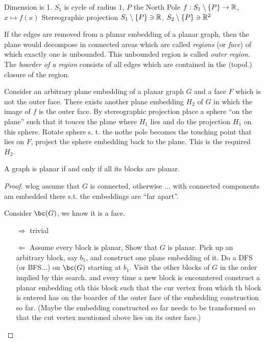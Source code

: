 \documentclass[aagt.tex]{subfiles}
\begin{document}
\begin{rem}
  Dimension is 1. $S_1$ is cycle of radius $1$, $P$ the North Pole
  $f: S_1 \setminus \{P\} \to \mathbb{R}$, $x \mapsto f(x)$
  Stereographic projection $S_1 \setminus \{P\} \ni \mathbb{R}$, $S_2 \setminus \{P\} \ni \mathbb{R}^2$
\end{rem}

\begin{defi*}
  If the edges are removed from a planar embedding of a planar graph, then the plane would decompose in connected areas which are called \emph{regions} (or \emph{face}) of which exactly one is unbounded.
  This unbounded region is called \emph{outer region}. The \emph{boarder of a region} consists of  all edges which are contained in the (topol.) closure of the region.
\end{defi*}

\begin{rem}
  Consider an arbitrary plane embedding of a planar graph $G$ and a face $F$ which is not the outer face.
  There exists another plane embedding $H_2$ of $G$ in which the image of $f$ is the outer face.
  By stereographic projection place a sphere \enquote{on the plane} such that it touces the plane where $H_1$ lies
  and do the projection $H_1$ on this sphere. Rotate sphere s. t. the nothe pole becomes the touching point that lies on $F$, project the sphere embedding back to the plane. This is the required $H_2$.
\end{rem}

\begin{prop}[4.1]\label{p_4_1}
  A graph is planar if and only if all its blocks are planar.
\end{prop}

\begin{proof}
  wlog assume that $G$ is connected, otherwise ... with connected components am embedded there s.t. the embeddings are \enquote{far apart}.
  
  Consider $\bc(G)$, we know it is a face.
  \begin{enumerate}
    \item[$\Rightarrow$] trivial
    \item[$\Leftarrow$] Assume every block is planar, Show that $G$ is planar.
    Pick up an arbitrary block, say $b_1$, and construct one plane embedding of it.
    Do a DFS (or BFS...) on $\bc(G)$ starting at $b_1$.
    Visit the other blocks of $G$ in the order implied by this search.
    and every time a new block is encountered construct a planar embedding oth this block such that the cur vertex from which th block is entered has on the boarder of the outer face of the embedding construction so far.
    (Maybe the embedding constructed so far needs to be transformed so that the cut vertex mentioned above lies on its outer face.)
  \end{enumerate}
\end{proof}
\end{document}
